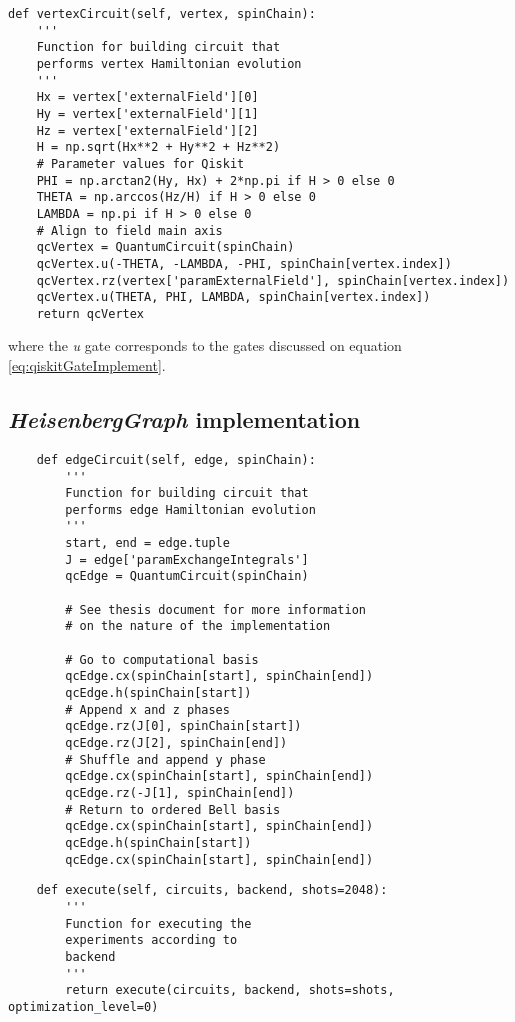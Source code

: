 \begin{verbatim}
def vertexCircuit(self, vertex, spinChain):
    '''
    Function for building circuit that 
    performs vertex Hamiltonian evolution
    '''
    Hx = vertex['externalField'][0]
    Hy = vertex['externalField'][1]
    Hz = vertex['externalField'][2]
    H = np.sqrt(Hx**2 + Hy**2 + Hz**2)
    # Parameter values for Qiskit
    PHI = np.arctan2(Hy, Hx) + 2*np.pi if H > 0 else 0
    THETA = np.arccos(Hz/H) if H > 0 else 0
    LAMBDA = np.pi if H > 0 else 0
    # Align to field main axis
    qcVertex = QuantumCircuit(spinChain)
    qcVertex.u(-THETA, -LAMBDA, -PHI, spinChain[vertex.index])
    qcVertex.rz(vertex['paramExternalField'], spinChain[vertex.index])
    qcVertex.u(THETA, PHI, LAMBDA, spinChain[vertex.index])
    return qcVertex
\end{verbatim}

\noindent where the \textit{u} gate corresponds to the gates discussed on equation \ref{eq:qiskitGateImplement}.

\subsection{\textit{HeisenbergGraph} implementation}

    \begin{verbatim}
    def edgeCircuit(self, edge, spinChain):
        '''
        Function for building circuit that
        performs edge Hamiltonian evolution
        '''
        start, end = edge.tuple
        J = edge['paramExchangeIntegrals']
        qcEdge = QuantumCircuit(spinChain)

        # See thesis document for more information
        # on the nature of the implementation

        # Go to computational basis
        qcEdge.cx(spinChain[start], spinChain[end])
        qcEdge.h(spinChain[start])
        # Append x and z phases
        qcEdge.rz(J[0], spinChain[start])
        qcEdge.rz(J[2], spinChain[end])
        # Shuffle and append y phase
        qcEdge.cx(spinChain[start], spinChain[end])
        qcEdge.rz(-J[1], spinChain[end])
        # Return to ordered Bell basis
        qcEdge.cx(spinChain[start], spinChain[end])
        qcEdge.h(spinChain[start])
        qcEdge.cx(spinChain[start], spinChain[end])
    \end{verbatim}

    \begin{verbatim}
    def execute(self, circuits, backend, shots=2048):
        '''
        Function for executing the
        experiments according to
        backend
        '''
        return execute(circuits, backend, shots=shots, optimization_level=0)
    \end{verbatim}

